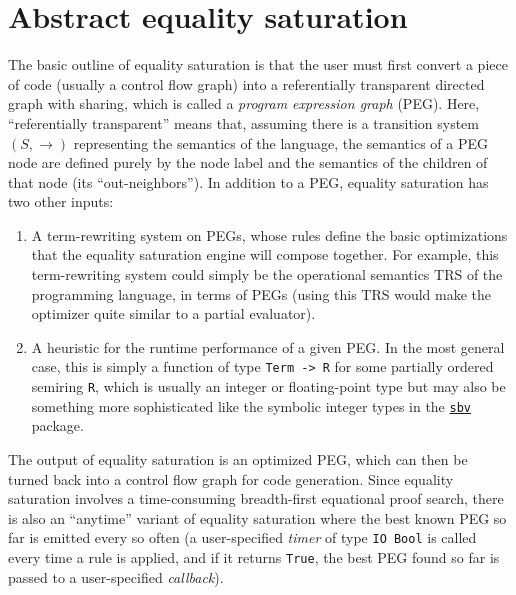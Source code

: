 \documentclass[11pt]{report}
\newcommand{\haskell}[1]{\texttt{#1}}
\begin{document}
\chapter{Abstract equality saturation}
\label{sec:abstract-eqsat}

The basic outline of equality saturation is that the user must first convert
a piece of code (usually a control flow graph) into a referentially transparent
directed graph with sharing, which is called a \textit{program expression graph}
(PEG)\footnotemark. Here, ``referentially transparent'' means that, assuming
there is a transition system $(S, {\to})$ representing the semantics of the
language, the semantics of a PEG node are defined purely by the node label and
the semantics of the children of that node (its ``out-neighbors''). In addition
to a PEG, equality saturation has two other inputs:


\vspace{0.5em}

\begin{enumerate}
\item {%
  A term-rewriting system on PEGs, whose rules define the basic optimizations
  that the equality saturation engine will compose together. For example, this
  term-rewriting system could simply be the operational semantics TRS of the
  programming language, in terms of PEGs (using this TRS would make the
  optimizer quite similar to a partial evaluator).
}
\item {%
  A heuristic for the runtime performance of a given PEG.
  In the most general case, this is simply a function of type
  \haskell{Term -> R} for some partially ordered semiring \haskell{R},
  which is usually an integer or floating-point type but may also be something
  more sophisticated like the symbolic integer types in the
  \href{https://hackage.haskell.org/package/sbv}{\texttt{sbv}} package.
}
\end{enumerate}

\vspace{0.5em}

The output of equality saturation is an optimized PEG, which can then be turned
back into a control flow graph for code generation. Since equality saturation
involves a time-consuming breadth-first equational proof search, there is also
an ``anytime'' variant of equality saturation where the best known PEG so far
is emitted every so often (a user-specified \textit{timer} of type
\haskell{IO Bool} is called every time a rule is applied, and if it returns
\haskell{True}, the best PEG found so far is passed to a user-specified
\textit{callback}).
\end{document}
